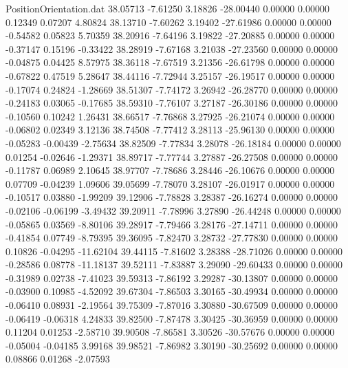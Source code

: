\begin{filecontents}{PositionOrientation.dat}
  38.05713   -7.61250    3.18826   -28.00440    0.00000    0.00000    0.12349    0.07207    4.80824
  38.13710   -7.60262    3.19402   -27.61986    0.00000    0.00000   -0.54582    0.05823    5.70359
  38.20916   -7.64196    3.19822   -27.20885    0.00000    0.00000   -0.37147    0.15196   -0.33422
  38.28919   -7.67168    3.21038   -27.23560    0.00000    0.00000   -0.04875    0.04425    8.57975
  38.36118   -7.67519    3.21356   -26.61798    0.00000    0.00000   -0.67822    0.47519    5.28647
  38.44116   -7.72944    3.25157   -26.19517    0.00000    0.00000   -0.17074    0.24824   -1.28669
  38.51307   -7.74172    3.26942   -26.28770    0.00000    0.00000   -0.24183    0.03065   -0.17685
  38.59310   -7.76107    3.27187   -26.30186    0.00000    0.00000   -0.10560    0.10242    1.26431
  38.66517   -7.76868    3.27925   -26.21074    0.00000    0.00000   -0.06802    0.02349    3.12136
  38.74508   -7.77412    3.28113   -25.96130    0.00000    0.00000   -0.05283   -0.00439   -2.75634
  38.82509   -7.77834    3.28078   -26.18184    0.00000    0.00000    0.01254   -0.02646   -1.29371
  38.89717   -7.77744    3.27887   -26.27508    0.00000    0.00000   -0.11787    0.06989    2.10645
  38.97707   -7.78686    3.28446   -26.10676    0.00000    0.00000    0.07709   -0.04239    1.09606
  39.05699   -7.78070    3.28107   -26.01917    0.00000    0.00000   -0.10517    0.03880   -1.99209
  39.12906   -7.78828    3.28387   -26.16274    0.00000    0.00000   -0.02106   -0.06199   -3.49432
  39.20911   -7.78996    3.27890   -26.44248    0.00000    0.00000   -0.05865    0.03569   -8.80106
  39.28917   -7.79466    3.28176   -27.14711    0.00000    0.00000   -0.41854    0.07749   -8.79395
  39.36095   -7.82470    3.28732   -27.77830    0.00000    0.00000    0.10826   -0.04295  -11.62104
  39.44115   -7.81602    3.28388   -28.71026    0.00000    0.00000   -0.28586    0.08778  -11.18137
  39.52111   -7.83887    3.29090   -29.60433    0.00000    0.00000   -0.31989    0.02738   -7.41023
  39.59313   -7.86192    3.29287   -30.13807    0.00000    0.00000   -0.03900    0.10985   -4.52092
  39.67304   -7.86503    3.30165   -30.49934    0.00000    0.00000   -0.06410    0.08931   -2.19564
  39.75309   -7.87016    3.30880   -30.67509    0.00000    0.00000   -0.06419   -0.06318    4.24833
  39.82500   -7.87478    3.30425   -30.36959    0.00000    0.00000    0.11204    0.01253   -2.58710
  39.90508   -7.86581    3.30526   -30.57676    0.00000    0.00000   -0.05004   -0.04185    3.99168
  39.98521   -7.86982    3.30190   -30.25692    0.00000    0.00000    0.08866    0.01268   -2.07593

\end{filecontents}

